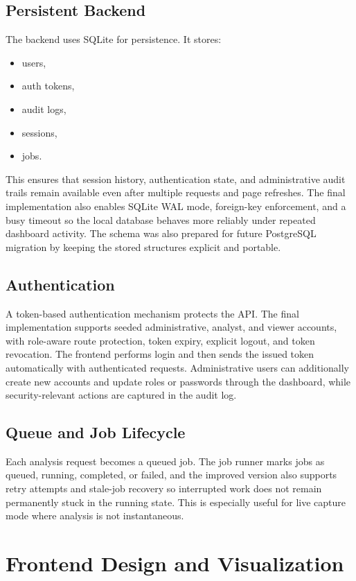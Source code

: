 \documentclass[12pt,a4paper]{report}
\begin{document}
\section{Persistent Backend}
The backend uses SQLite for persistence. It stores:
\begin{itemize}[leftmargin=1.5em]
    \item users,
    \item auth tokens,
    \item audit logs,
    \item sessions,
    \item jobs.
\end{itemize}
This ensures that session history, authentication state, and administrative audit trails remain available even after multiple requests and page refreshes. The final implementation also enables SQLite WAL mode, foreign-key enforcement, and a busy timeout so the local database behaves more reliably under repeated dashboard activity. The schema was also prepared for future PostgreSQL migration by keeping the stored structures explicit and portable.

\section{Authentication}
A token-based authentication mechanism protects the API. The final implementation supports seeded administrative, analyst, and viewer accounts, with role-aware route protection, token expiry, explicit logout, and token revocation. The frontend performs login and then sends the issued token automatically with authenticated requests. Administrative users can additionally create new accounts and update roles or passwords through the dashboard, while security-relevant actions are captured in the audit log.

\section{Queue and Job Lifecycle}
Each analysis request becomes a queued job. The job runner marks jobs as queued, running, completed, or failed, and the improved version also supports retry attempts and stale-job recovery so interrupted work does not remain permanently stuck in the running state. This is especially useful for live capture mode where analysis is not instantaneous.

\chapter{Frontend Design and Visualization}
\end{document}
